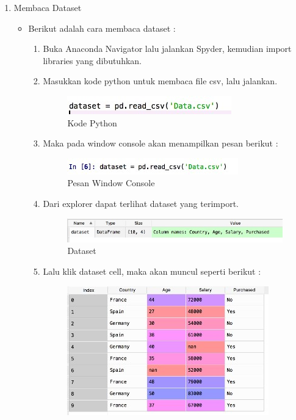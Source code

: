 \begin{enumerate}
\item Membaca Dataset
	\begin{itemize}
	\item Berikut adalah cara membaca dataset :
		\begin{enumerate}
			\item Buka Anaconda Navigator lalu jalankan Spyder, kemudian import libraries yang dibutuhkan.
			\item Masukkan kode python untuk membaca file csv, lalu jalankan.
				\begin{figure}[ht]
				\centering
				\includegraphics[scale=0.8]{figures/j41.jpg}
				\caption{Kode Python}
				\label{contoh}
				\end{figure}
			\item Maka pada window console akan menampilkan pesan berikut :
				\begin{figure}[ht]
				\centering
				\includegraphics[scale=0.9]{figures/j42.jpg}
				\caption{Pesan Window Console}
				\label{contoh}
				\end{figure}
			\item Dari explorer dapat terlihat dataset yang terimport.
				\begin{figure}[ht]
				\centering
				\includegraphics[scale=0.6]{figures/j43.jpg}
				\caption{Dataset}
				\label{contoh}
				\end{figure}
			\item Lalu klik dataset cell, maka akan muncul seperti berikut :
				\begin{figure}[ht]
				\centering
				\includegraphics[scale=0.7]{figures/j44.jpg}

\end{figure}
\end{enumerate}
\end{itemize}
\end{enumerate}
